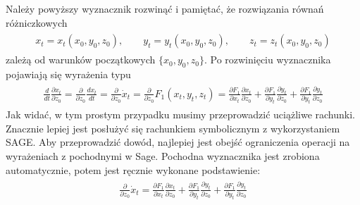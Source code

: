 \documentclass[a4paper,12pt,polish]{sphinxmanual}
\begin{document}
Należy powyższy wyznacznik rozwinąć i pamiętać, że rozwiązania równań różniczkowych
\label{ch1/chI022:equation-eqn29}\begin{gather}
\begin{split}x_t = x_t(x_0, y_0, z_0), \qquad y_t = y_t(x_0, y_0, z_0), \qquad z_t = z_t(x_0, y_0, z_0)\end{split}\label{ch1/chI022-eqn29}
\end{gather}
zależą od warunków początkowych $\{x_0, y_0, z_0\}$.  Po rozwinięciu wyznacznika pojawiają się wyrażenia typu
\label{ch1/chI022:equation-eqn30}\begin{gather}
\begin{split}\frac{d}{dt}  \frac{ \partial x_t}{\partial z_0} = \frac{ \partial }{\partial z_0} \frac{dx_t}{dt} = \frac{ \partial }{\partial z_0} \dot x_t = \frac{ \partial }{\partial z_0} F_1(x_t, y_t, z_t) = \frac{ \partial F_1}{\partial x_t}  \frac{ \partial x_t}{\partial z_0} +  \frac{ \partial F_1}{\partial y_t}  \frac{ \partial y_t}{\partial z_0}  +\frac{ \partial F_1}{\partial y_t}  \frac{ \partial y_t}{\partial z_0}\end{split}\label{ch1/chI022-eqn30}
\end{gather}
Jak widać, w tym prostym przypadku musimy przeprowadzić uciążliwe rachunki. Znacznie
lepiej jest posłużyć się rachunkiem symbolicznym z wykorzystaniem SAGE. Aby przeprowadzić
dowód, najlepiej jest obejść ograniczenia operacji na wyrażeniach z pochodnymi w Sage.
Pochodna wyznacznika jest zrobiona automatycznie, potem jest ręcznie wykonane podstawienie:
\label{ch1/chI022:equation-eqn31}\begin{gather}
\begin{split} \frac{ \partial }{\partial z_0} \dot x_t = \frac{ \partial F_1}{\partial x_t}  \frac{ \partial x_t}{\partial z_0} +  \frac{ \partial F_1}{\partial y_t}  \frac{ \partial y_t}{\partial z_0}  +\frac{ \partial F_1}{\partial y_t}  \frac{ \partial y_t}{\partial z_0}\end{split}\label{ch1/chI022-eqn31}
\end{gather}
\end{document}
